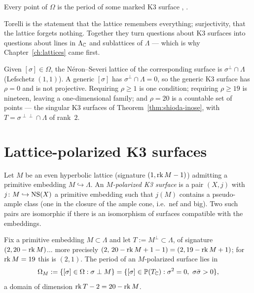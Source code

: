 \begin{theorem}\label{thm:surj}
Every point of $\Omega$ is the period of some marked K3 surface
\cite{Todorov1980,Looijenga1981}, \cite[Thm.~7.4.1]{Huybrechts2016}.
\end{theorem}

Torelli is the statement that the lattice remembers everything; surjectivity,
that the lattice forgets nothing. Together they turn questions about K3
surfaces into questions about lines in $\Lambda_{\mathbb{C}}$ and sublattices of
$\Lambda$ --- which is why Chapter~\ref{ch:lattices} came first.

\begin{example}
Given $[\sigma]\in\Omega$, the N\'eron--Severi lattice of the corresponding
surface is $\sigma^{\perp}\cap\Lambda$ (Lefschetz $(1,1)$). A generic
$[\sigma]$ has $\sigma^{\perp}\cap\Lambda=0$, so the generic K3 surface has
$\rho=0$ and is not projective. Requiring $\rho\ge1$ is one condition;
requiring $\rho\ge19$ is nineteen, leaving a one-dimensional family; and
$\rho=20$ is a countable set of points --- the singular K3 surfaces of
Theorem~\ref{thm:shioda-inose}, with $T=\sigma^{\perp\perp}\cap\Lambda$ of rank~$2$.
\end{example}

\section{Lattice-polarized K3 surfaces}

\begin{definition}
Let $M$ be an even hyperbolic lattice (signature $(1,\operatorname{rk} M-1)$) admitting a
primitive embedding $M\hookrightarrow\Lambda$. An \emph{$M$-polarized K3
surface} is a pair $(X,j)$ with $j\colon M\hookrightarrow\operatorname{NS}(X)$ a primitive
embedding such that $j(M)$ contains a pseudo-ample class (one in the closure
of the ample cone, i.e.\ nef and big). Two such pairs are isomorphic if there
is an isomorphism of surfaces compatible with the embeddings.
\end{definition}

Fix a primitive embedding $M\subset\Lambda$ and let $T:=M^{\perp}\subset\Lambda$,
of signature $(2,20-\operatorname{rk} M)$... more precisely $(2,\,20-\operatorname{rk} M+1-1)=(2,19-\operatorname{rk} M+1)$;
for $\operatorname{rk} M=19$ this is $(2,1)$. The period of an $M$-polarized surface lies in
\[
  \Omega_M:=\{[\sigma]\in\Omega:\sigma\perp M\}
  =\{[\sigma]\in\mathbb{P}(T_{\mathbb{C}}):\sigma^2=0,\ \sigma\bar\sigma>0\},
\]
a domain of dimension $\operatorname{rk} T-2=20-\operatorname{rk} M$.

